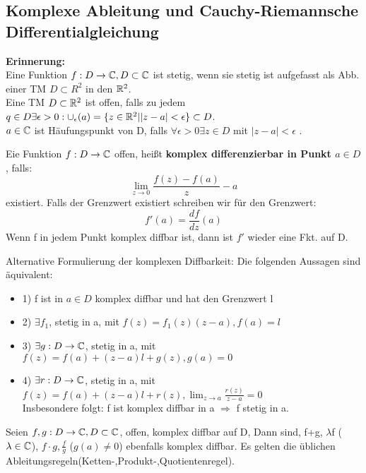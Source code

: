 \subsection{Komplexe Ableitung und Cauchy-Riemannsche Differentialgleichung}
\textbf{Erinnerung:}\\
Eine Funktion $f:D \to \mathbb{C}, D \subset \mathbb{C}$ ist stetig, wenn sie stetig ist aufgefasst als Abb. einer TM $D\subset R^2$ in den $\mathbb{R}^2$.\\
Eine TM $D\subset \mathbb{R}^2$ ist offen, falls zu jedem $q \in D \exists \epsilon > 0: \cup _\epsilon(a) = \{z \in \mathbb{R}^2| |z-a| < \epsilon\} \subset D$.\\
$a \in \mathbb{C}$ ist Häufungspunkt von D, falls $ \forall \epsilon > 0 \exists z \in D$ mit $|z-a| < \epsilon$ .\\



\begin{definition}
Eie Funktion $f: D \to \mathbb{C}$ offen, heißt \textbf{komplex differenzierbar in Punkt $a\in D$}, falls:
\[
\lim_{z \to 0} \frac{f(z) -f(a)}{z}-a
\]
existiert. Falls der Grenzwert existiert schreiben wir für den Grenzwert:
\[
f\prime(a) = \frac{df}{dz}(a)
\]
Wenn f in jedem Punkt komplex diffbar ist, dann ist $f\prime$ wieder eine Fkt. auf D.
\end{definition}

\begin{bemerkung}
Alternative Formulierung der komplexen Diffbarkeit:
Die folgenden Aussagen sind äquivalent:
\begin{itemize}
	\item
	1) f ist in $a\in D$ komplex diffbar und hat den Grenzwert l
	\item
	2) $\exists f_1$, stetig in a, mit $f(z) = f_1(z)(z-a), f(a) = l$
	\item
	3) $\exists g: D \to \mathbb{C}$, stetig in a, mit $f(z) = f(a) + (z-a)l+ g(z), g(a)=0$
	\item
	4) $\exists r: D\to \mathbb{C}$, stetig in a, mit $f(z) = f(a) +(z-a)l + r(z), \lim_{z \to a}\frac{r(z)}{z-a}= 0$\\
	Insbesondere folgt: f ist komplex diffbar in a $\Rightarrow$ f stetig in a.
\end{itemize}
\end{bemerkung}

\begin{satz}
Seien $f,g: D \to \mathbb{C}, D\subset \mathbb{C}$, offen, komplex diffbar auf D, Dann sind, f+g, $\lambda$f ($\lambda \in \mathbb{C}$), $f \cdot g, \frac{f}{g}$ ($g(a) \neq 0$) ebenfalls komplex diffbar. Es gelten die üblichen Ableitungsregeln(Ketten-,Produkt-,Quotientenregel).
\end{satz}